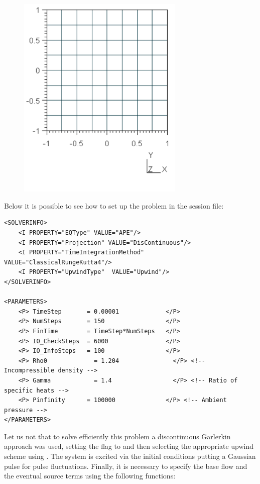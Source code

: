 \begin{figure}
	\includegraphics[width=300px]{Figures/APE_Geometry.png}
\end{figure}

Below it is possible to see how to set up the problem in the session file:

\begin{lstlisting}[style=XmlStyle]
<SOLVERINFO>
    <I PROPERTY="EQType" VALUE="APE"/> 
    <I PROPERTY="Projection" VALUE="DisContinuous"/>
    <I PROPERTY="TimeIntegrationMethod"  VALUE="ClassicalRungeKutta4"/>
    <I PROPERTY="UpwindType"  VALUE="Upwind"/> 
</SOLVERINFO>

<PARAMETERS>
    <P> TimeStep       = 0.00001             </P>
    <P> NumSteps       = 150                 </P>
    <P> FinTime        = TimeStep*NumSteps   </P>
    <P> IO_CheckSteps  = 6000                </P>
    <P> IO_InfoSteps   = 100                 </P>
    <P> Rho0             = 1.204               </P> <!-- Incompressible density -->
    <P> Gamma            = 1.4                 </P> <!-- Ratio of specific heats -->
    <P> Pinfinity      = 100000              </P> <!-- Ambient pressure -->
</PARAMETERS>
\end{lstlisting}

Let us not that to solve efficiently this problem a discontinuous Garlerkin
approach was used, setting the flag  to 
and then selecting the appropriate upwind scheme using . The
system is excited via the initial conditions putting a Gaussian pulse for pulse
fluctuations.  Finally, it is necessary to specify the base flow and the
eventual source terms using the following functions:

